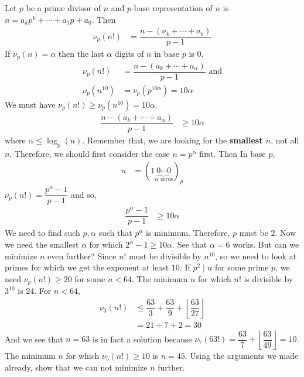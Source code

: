 \documentclass[problems.tex]{subfile}
\begin{document}
	\begin{solution}
		Let $p$ be a prime divisor of $n$ and $p$-base representation of $n$ is $n=a_kp^k+\cdots+a_1p+a_0$. Then
			\begin{align*}
				\nu_p(n!) & = \dfrac{n-(a_k+\cdots+a_0)}{p-1}
			\end{align*}
		If $\nu_p(n)=\alpha $ then the last $\alpha $ digits of $n$ in base $p$ is $0$.
			\begin{align*}
				\nu_p(n!) & = \dfrac{n-(a_k+\cdots+a_{\alpha })}{p-1}\text { and}\\
				\nu_p(n^{10}) & = \nu_p(p^{10\alpha })=10\alpha
			\end{align*}
		We must have $\nu_p(n!)\geq \nu_p(n^{10})=10\alpha$.
			\begin{align*}
				\dfrac{n-(a_k+\cdots+a_\alpha)}{p-1} & \geq10\alpha
			\end{align*}
		where $\alpha\leq\log_p(n)$. Remember that, we are looking for the \textbf{smallest $n$}, not all $n$. Therefore, we should first consider the case $n=p^\alpha$ first. Then In base $p$,
			\begin{align*}
				n & = (1\underbrace{0\cdots0}_{\alpha\text { zeros}})_p
			\end{align*}
		$\nu_p(n!) = \dfrac{p^\alpha-1}{p-1}$ and so,
			\begin{align*}
				\dfrac{p^\alpha-1}{p-1} &\geq10\alpha
			\end{align*}
		We need to find such $p,\alpha$ such that $p^\alpha$ is minimum. Therefore, $p$ must be $2$. Now we need the smallest $\alpha$ for which $2^\alpha-1\geq10\alpha $. See that $\alpha = 6$ works. But can we minimize $n$ even further? Since $n!$ must be divisible by $n^{10}$, so we need to look at primes for which we get the exponent at least $10$. If $p^2\mid n$ for some prime $p$, we need $\nu_p(n!)\geq20$ for some $n<64$. The minimum $n$ for which $n!$ is divisible by $3^{10}$ is $24$. For $n<64$,
			\begin{align*}
				\nu_3(n!) & \leq \dfrac{63}{3}+\dfrac{63}{9}+\left\lfloor\dfrac{63}{27}\right\rfloor\\
						  & = 21+7+2=30
			\end{align*}
		And we see that $n=63$ is in fact a solution because $\nu_7(63!) = \dfrac{63}{7}+\left\lfloor\dfrac{63}{49}\right\rfloor=10$. The minimum $n$ for which $\nu_5(n!)\geq10$ is $n=45$. Using the arguments we made already, show that we can not minimize $n$ further.
	\end{solution}
\end{document}
